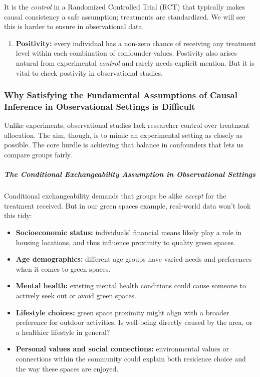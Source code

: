 \documentclass[
  singlecolumn]{article}
\let\oldsubparagraph\subparagraph
\renewcommand{\subparagraph}[1]{\oldsubparagraph{#1}\mbox{}}
\providecommand{\tightlist}{%
  \setlength{\itemsep}{0pt}\setlength{\parskip}{0pt}}\usepackage{longtable,booktabs,array}
\begin{document}
It is the \emph{control} in a Randomized Controlled Trial (RCT) that
typically makes causal consistency a safe assumption; treatments are
standardized. We will see this is harder to ensure in observational
data.

\begin{enumerate}
\def\labelenumi{\arabic{enumi}.}
\setcounter{enumi}{2}
\tightlist
\item
  \textbf{Positivity:} every individual has a non-zero chance of
  receiving any treatment level within each combination of confounder
  values. Postivity also arises natural from experimental \emph{control}
  and rarely needs explicit mention. But it is vital to check postivity
  in observational studies.
\end{enumerate}

\subsubsection{Why Satisfying the Fundamental Assumptions of Causal
Inference in Observational Settings is
Difficult}\label{why-satisfying-the-fundamental-assumptions-of-causal-inference-in-observational-settings-is-difficult}

Unlike experiments, observational studies lack researcher control over
treatment allocation. The aim, though, is to mimic an experimental
setting as closely as possible. The core hurdle is achieving that
balance in confounders that lets us compare groups fairly.

\subparagraph{The Conditional Exchangeability Assumption in
Observational
Settings}\label{the-conditional-exchangeability-assumption-in-observational-settings}

Conditional exchangeability demands that groups be alike \emph{except}
for the treatment received. But in our green spaces example, real-world
data won't look this tidy:

\begin{itemize}
\tightlist
\item
  \textbf{Socioeconomic status:} individuals' financial means likely
  play a role in housing locations, and thus influence proximity to
  quality green spaces.
\item
  \textbf{Age demographics:} different age groups have varied needs and
  preferences when it comes to green spaces.
\item
  \textbf{Mental health:} existing mental health conditions could cause
  someone to actively seek out or avoid green spaces.
\item
  \textbf{Lifestyle choices:} green space proximity might align with a
  broader preference for outdoor activities. Is well-being directly
  caused by the area, or a healthier lifestyle in general?
\item
  \textbf{Personal values and social connections:} environmental values
  or connections within the community could explain both residence
  choice and the way these spaces are enjoyed.
\end{itemize}
\end{document}
